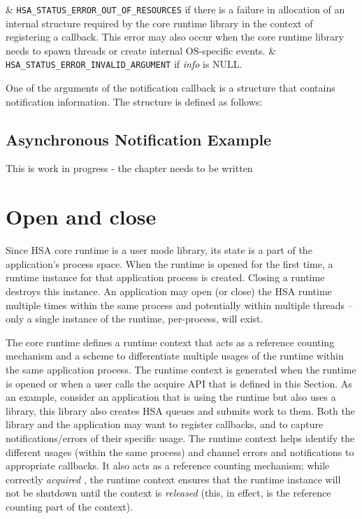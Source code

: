 \documentclass{book}
\newcommand{\diffblock}[1]{#1}
\newcommand{\emphld}[1]{\begin{DIFnomarkup} \emph{#1}
\end{DIFnomarkup}}
\newcommand{\dbtt}[1]{\diffblock{\texttt{#1}}}
\newenvironment{DIFnomarkup}{}{}
\begin{document}
\begin{easylist}
& \dbtt{HSA\_STATUS\_ERROR\_OUT\_OF\_RESOURCES} if there is a failure
in allocation of an internal structure required by the core runtime
library in the context of registering a callback. This error may
also occur when the core runtime library needs to spawn threads or
create internal OS-specific events.
& \dbtt{HSA\_STATUS\_ERROR\_INVALID\_ARGUMENT}
if {\itshape info} is NULL.
\end{easylist}

One of the arguments of the notification callback is a structure
that contains notification information. The structure is defined as
follows:


\subsection{Asynchronous Notification Example}
This is work in progress - the chapter needs to be written

\hypertarget{init}{}\section{Open and close}\label{init}

Since HSA core runtime is a user mode library, its state is a part
of the application's process space. When the runtime is opened for
the first time, a runtime instance for that application process is
created. Closing a runtime destroys this instance. An application
may open (or close) the HSA runtime multiple times within the same
process and potentially within multiple threads -- only a
single instance of the runtime, per-process, will exist.

The core runtime defines a runtime context that acts as a reference
counting mechanism and a scheme to differentiate multiple usages of
the runtime within the same application process. The runtime context
is generated when the runtime is opened or when a
user calls the acquire API that is defined in this Section. As an
example, consider an application that is using the runtime but also
uses a library, this library also creates HSA queues and submits
work to them. Both the library and the application may want to register
callbacks, and to capture notifications/errors of their specific
usage. The runtime context helps identify the different usages (within
the same process) and channel errors and notifications to
appropriate callbacks. It also acts as a reference counting
mechanism; while correctly \emphld{acquired}, the runtime context
ensures that the runtime instance will not be shutdown until the
context is \emphld{released} (this, in effect, is the reference
counting part of the context).
\end{document}
